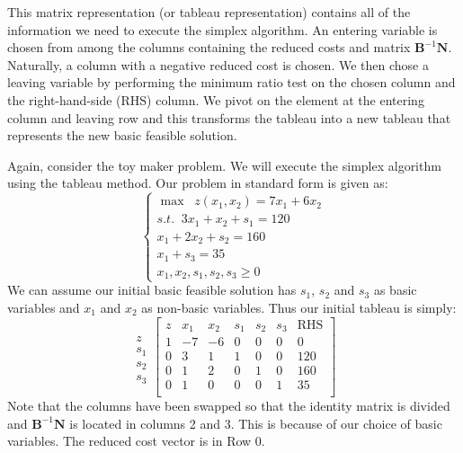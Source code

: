 This matrix representation (or tableau representation) contains all of the information we need to execute the simplex algorithm. An entering variable is chosen from among the columns containing the reduced costs and matrix $\mathbf{B}^{-1}\mathbf{N}$. Naturally, a column with a negative reduced cost is chosen. We then chose a leaving variable by performing the minimum ratio test on the chosen column and the right-hand-side (RHS) column. We pivot on the element at the entering column and leaving row and this transforms the tableau into a new tableau that represents the new basic feasible solution.

\begin{example} Again, consider the toy maker problem. We will execute the simplex algorithm using the tableau method. Our problem in standard form is given as:
\begin{displaymath}
\left\{
\begin{aligned}
\max\;\; z(x_1,x_2) = 7x_1 + 6x_2\\
s.t.\;\; 3x_1 + x_2 + s_1 = 120\\
 x_1 + 2x_2 + s_2 = 160\\
 x_1 + s_3 = 35\\
 x_1,x_2,s_1,s_2,s_3\geq 0
\end{aligned}
\right.
\end{displaymath}
We can assume our initial basic feasible solution has $s_1$, $s_2$ and $s_3$ as basic variables and $x_1$ and $x_2$ as non-basic variables. Thus our initial tableau is simply:
\begin{equation}
\begin{array}{c}
\\
z\\
s_1\\
s_2\\
s_3
\end{array}
\left[
\begin{array}{c|ccccc|c}
z& x_1 & x_2 & s_1 & s_2 & s_3 & \text{RHS}\\
\hline
1 & -7 & -6 & 0 & 0 & 0 & 0\\
\hline
0 &  3 &  1 & 1 & 0 & 0 & 120\\
0 &  1 &  2 & 0 & 1 & 0 & 160\\
0 &  1 &  0 & 0 & 0 & 1 & 35\\
\end{array}\right]
\end{equation}
Note that the columns have been swapped so that the identity matrix is divided and $\mathbf{B}^{-1}\mathbf{N}$ is located in columns 2 and 3. This is because of our choice of basic variables. The reduced cost vector is in Row 0.


\end{example}
